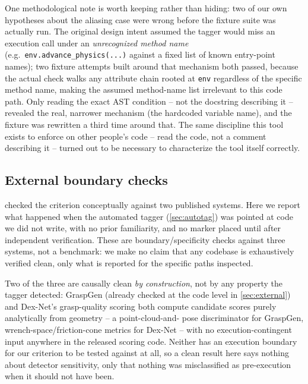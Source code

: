 \documentclass[journal]{IEEEtran}
\begin{document}
One methodological note is worth keeping rather than hiding: two of our
own hypotheses about the aliasing case were wrong before the fixture
suite was actually run. The original design intent assumed the tagger
would miss an execution call under an \emph{unrecognized method name}
(e.g.\ \texttt{env.advance\_physics(...)} against a fixed list of known
entry-point names); two fixture attempts built around that mechanism both
passed, because the actual check walks any attribute chain rooted at
\texttt{env} regardless of the specific method name, making the assumed
method-name list irrelevant to this code path. Only reading the exact AST
condition -- not the docstring describing it -- revealed the real,
narrower mechanism (the hardcoded variable name), and the fixture was
rewritten a third time around that. The same discipline this tool exists
to enforce on other people's code -- read the code, not a comment
describing it -- turned out to be necessary to characterize the tool
itself correctly.

\subsection{External boundary checks}
\label{sec:extboundary}

 checked the criterion conceptually against two
published systems. Here we report what happened when the automated
tagger (\cref{sec:autotag}) was pointed at code we did not write, with
no prior familiarity, and no marker placed until after independent
verification. These are boundary/specificity checks against three
systems, not a benchmark: we make no claim that any codebase is
exhaustively verified clean, only what is reported for the specific
paths inspected.

Two of the three are causally clean \emph{by construction}, not by any
property the tagger detected: GraspGen (already checked at the code
level in \cref{sec:external}) and Dex-Net's grasp-quality scoring
\cite{mahler2017dexnet} both compute
candidate scores purely analytically from geometry -- a point-cloud-and-
pose discriminator for GraspGen, wrench-space/friction-cone metrics for
Dex-Net -- with no execution-contingent input anywhere in the released
scoring code. Neither has an execution boundary for our criterion to be
tested against at all, so a clean result here says nothing about
detector sensitivity, only that nothing was misclassified as
pre-execution when it should not have been.
\end{document}
